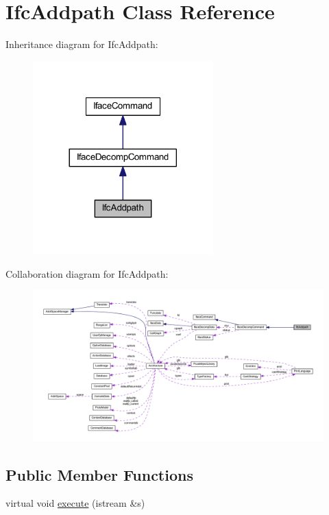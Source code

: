 \hypertarget{class_ifc_addpath}{}\section{Ifc\+Addpath Class Reference}
\label{class_ifc_addpath}


Inheritance diagram for Ifc\+Addpath\+:
\nopagebreak
\begin{figure}[H]
\begin{center}
\leavevmode
\includegraphics[width=197pt]{class_ifc_addpath__inherit__graph}
\end{center}
\end{figure}


Collaboration diagram for Ifc\+Addpath\+:
\nopagebreak
\begin{figure}[H]
\begin{center}
\leavevmode
\includegraphics[width=350pt]{class_ifc_addpath__coll__graph}
\end{center}
\end{figure}
\subsection*{Public Member Functions}
\begin{DoxyCompactItemize}
\item 
virtual void \mbox{\hyperlink{class_ifc_addpath_abe711b93972455d4790fc6649cf67675}{execute}} (istream \&s)
\end{DoxyCompactItemize}
